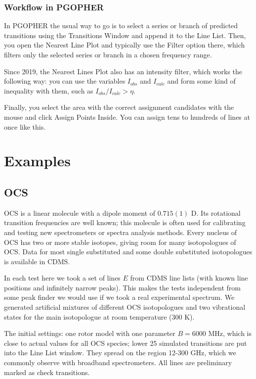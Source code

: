 \documentclass[11pt]{article}
\begin{document}
\subsubsection{Workflow in PGOPHER}

In PGOPHER the usual way to go is to select a series or branch of predicted transitions using the Transitions Window and append it to the Line List. Then, you open the Nearest Line Plot and typically use the Filter option there, which filters only the selected series or branch in a chosen frequency range. 

Since 2019, the Nearest Lines Plot also has an intensity filter, which works the following way: you can use the variables $I_{obs}$ and $I_{calc}$ and form some kind of inequality with them, such as $I_{obs} / I_{calc} > \eta$.

Finally, you select the area with the correct assignment candidates with the mouse and click Assign Points Inside. You can assign tens to hundreds of lines at once like this. 
\section{Examples}
\subsection{OCS}

OCS is a linear molecule with a dipole moment of $0.715(1)$ D. Its rotational transition frequencies are well known; this molecule is often used for calibrating and testing new spectrometers or spectra analysis methods. Every nucleus of OCS has two or more stable isotopes, giving room for many isotopologues of OCS. Data for most single substituted and some double substituted isotopologues is available in CDMS.

In each test here we took a set of lines $E$ from CDMS line lists (with known line positions and infinitely narrow peaks). This makes the tests independent from some peak finder we would use if we took a real experimental spectrum. We generated artificial mixtures of different OCS isotopologues and two vibrational states for the main isotopologue at room temperature (300 K).

The initial settings: one rotor model with one parameter $B = 6000$ MHz, which is close to actual values for all OCS species; lower 25 simulated transitions are put into the Line List window. They spread on the region 12-300 GHz, which we commonly observe with broadband spectrometers. All lines are preliminary marked as check transitions. 
\end{document}
